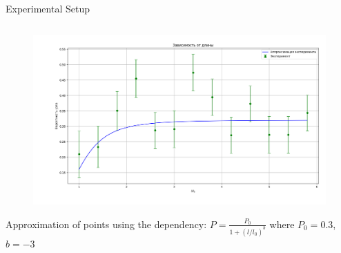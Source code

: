 \begin{frame}{Experimental Setup}
\begin{columns}
\begin{column}{0.6\linewidth}
\begin{figure}[H]
\includegraphics[width=1\linewidth]{img/exp_er.png}
\end{figure}
Approximation of points using the dependency:
$P = \frac{P_0}{1+(l/l_0)^b}$
where $P_0 = 0.3$, $b = -3$
\end{column}
\end{columns}
\end{frame}

